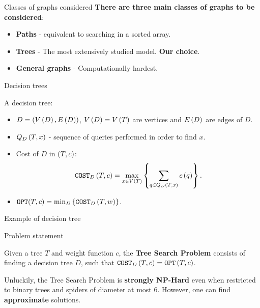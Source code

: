 \begin{frame}{Classes of graphs considered}
	\textbf{There are three main classes of graphs to be considered}:
	\begin{itemize}
	\item \textbf{Paths} - equivalent to searching in a sorted array. 
    \pause
	\item \textbf{Trees} -  The most extensively studied model. \textbf{Our choice}.
    \pause
    \item \textbf{General graphs} - Computationally hardest.
	\end{itemize}
\end{frame}

\begin{frame}{Decision trees}
        \begin{definition}
        A decision tree:
        \begin{itemize}
            \item $D=(V\left( D \right), E\left( D \right))$, $V\left( D \right)=V\left( T \right)$ are vertices and $E\left( D \right)$ are edges of $D$.
            \pause
            \item $Q_D\left( T,x \right)$ - sequence of queries performed in order to find $x$.
            \pause
            \item Cost of $D$ in $\left( T,c \right)$:
            $$
\texttt{COST}_D\left( T, c \right) = \max_{x\in V\left( T \right)} \left\{ \sum_{q\in Q_{D}\left( T,x \right)}c\left( q \right) \right\}.
$$
            \pause
        \item $\texttt{OPT}(T, c) = \min_{D} \left\{ \texttt{COST}_D\left( T, w \right) \right\}$.
        \end{itemize}
        \end{definition}
\end{frame}

\begin{frame}{Example of decision tree}
    
\end{frame}

\begin{frame}{Problem statement}

    \begin{definition}
        Given a tree $T$ and weight function $c$, the \textbf{Tree Search Problem} consists of finding a decision tree $D$, such that $\texttt{COST}_D\left( T,c \right)=\texttt{OPT}\left( T,c \right)$.
    \end{definition}

    \pause

    Unluckily, the Tree Search Problem is \textbf{strongly NP-Hard} even when restricted to binary trees and spiders of diameter at most 6. However, one can find \textbf{approximate} solutions. 

\end{frame}
